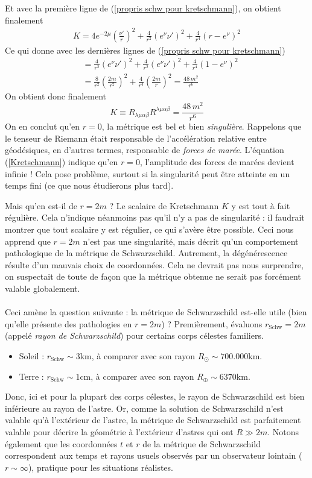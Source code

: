 Et avec la première ligne de (\ref{propris schw pour kretschmann}), on obtient finalement
\begin{align*}
    K= 4 e^{-2\mu} \left( \frac{\nu'}{r} \right)^2 + \frac{4}{r^2} (e^{\nu} \nu')^2 + \frac{4}{r^4} (r - e^{\nu})^2
\end{align*}
Ce qui donne avec les dernières lignes de (\ref{propris schw pour kretschmann})
\begin{align*}
&= \frac{4}{r^2} \left( e^\nu \nu' \right)^2 + \frac{4}{r^2} (e^{\nu} \nu')^2 + \frac{4}{r^4} (1 - e^\nu)^2 \\
&= \frac{8}{r^2} \left( \frac{2m}{r^2} \right)^2 + \frac{4}{r^4} \left( \frac{2m}{r} \right)^2 = \frac{48 \, m^2}{r^6}
\end{align*}
On obtient donc finalement
\begin{equation}
    \label{Kretschmann}
    \boxed{K \equiv R_{\lambda \mu \alpha \beta} R^{\lambda\mu\alpha\beta} = \frac{48 \, m^2}{r^6}}
\end{equation}
On en conclut qu'en $r = 0$, la métrique est bel et bien \emph{singulière}. Rappelons que le tenseur de Riemann était responsable de l'accélération relative entre géodésiques, en d'autres termes, responsable de \emph{forces de marée}. L'équation (\ref{Kretschmann}) indique qu'en $r=0$, l'amplitude des forces de marées devient infinie ! Cela pose problème, surtout si la singularité peut être atteinte en un temps fini (ce que nous étudierons plus tard).

Mais qu'en est-il de $r = 2m$ ? Le scalaire de Kretschmann $K$ y est tout à fait régulière. Cela n'indique néanmoins pas qu'il n'y a pas de singularité : il faudrait montrer que tout scalaire y est régulier, ce qui s'avère être possible. Ceci nous apprend que $r=2m$ n'est pas une singularité, mais décrit qu'un comportement pathologique de la métrique de Schwarzschild. Autrement, la dégénérescence résulte d'un mauvais choix de coordonnées. Cela ne devrait pas nous surprendre, on suspectait de toute de façon que la métrique obtenue ne serait pas forcément valable globalement. \\
\\
Ceci amène la question suivante : la métrique de Schwarzschild est-elle utile (bien qu'elle présente des pathologies en $r=2m$) ? Premièrement, évaluons $r_\text{Schw}=2m $ (appelé \emph{rayon de Schwarzschild}) pour certains corps célestes familiers.
\begin{itemize}
    \item Soleil : $r_\text{Schw} \sim 3$km, à comparer avec son rayon $R_\odot \sim 700.000$km.
    \item Terre : $r_\text{Schw} \sim 1$cm, à comparer avec son rayon $R_\oplus \sim 6370$km.
\end{itemize}
Donc, ici et pour la plupart des corps célestes, le rayon de Schwarzschild est bien inférieure au rayon de l'astre. Or, comme la solution de Schwarzschild n'est valable qu'à l'extérieur de l'astre, la métrique de Schwarzschild est parfaitement valable pour décrire la géométrie à l'extérieur d'astres qui ont $R \gg 2m$. Notons également que les coordonnées $t$ et $r$ de la métrique de Schwarzschild correspondent aux temps et rayons usuels observés par un observateur lointain ($r \sim \infty$), pratique pour les situations réalistes.
